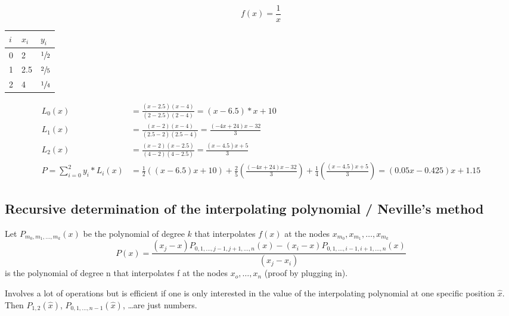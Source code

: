 \begin{example}
    \begin{equation*}
        f(x)= \frac{1}{x}
    \end{equation*}
    \begin{center}
        \begin{tabular}{l l l}
            \toprule
            $i$ & $x_i$ & $y_i$          \\
            \midrule
            0   & 2     & $\sfrac{1}{2}$ \\
            1   & 2.5   & $\sfrac{2}{5}$ \\
            2   & 4     & $\sfrac{1}{4}$ \\
            \bottomrule
        \end{tabular}
    \end{center}

    \begin{align*}
        L_0(x) &= \frac{(x-2.5)(x-4)}{(2-2.5)(2-4)}=(x-6.5)*x+10\\
        L_1(x) &= \frac{(x-2)(x-4)}{(2.5-2)(2.5-4)}=\frac{(-4x+24)x-32}{3}\\
        L_2(x) &= \frac{(x-2)(x-2.5)}{(4-2)(4-2.5)}= \frac{(x-4.5)x+5}{3}\\
        P=\sum_{i=0}^{2}y_i*L_i(x) &= \frac{1}{2}((x-6.5)x+10)+ \frac{2}{5}
        \left( \frac{(-4x+24)x-32}{3} \right)+\frac{1}{4}\left( \frac{(x-4.5)x+5}{3} \right)
        =(0.05x-0.425)x+1.15
    \end{align*}
\end{example}

\subsection{Recursive determination of the interpolating polynomial / Neville's method}\label{subsec:recursive-determination-of-the-interpolating-polynomial-/-neville's-method}
Let $P_{m_0, m_1, \dots, m_k} (x)$ be the polynomial of degree $k$ that interpolates $f(x)$ at the nodes $x_{m_0}, x_{m_1},\ldots,x_{m_k}$
\begin{equation*}
    P(x)= \frac{(x_j-x)P_{0,1,\ldots, j-1, j+1, \ldots, n}(x)-(x_i-x)P_{0,1,\ldots, i-1, i+1, \ldots, n}(x)}{(x_j-x_i)}
\end{equation*}
is the polynomial of degree n that interpolates f at the nodes $x_o, \ldots, x_n$ (proof by plugging in).

Involves a lot of operations but is efficient if one is only interested in the value of the interpolating polynomial at one specific position $\hat{x}$.
Then $P_{1,2}(\hat{x})$, $P_{0,1,\ldots, n-1}(\hat{x})$, \ldots are just numbers.

